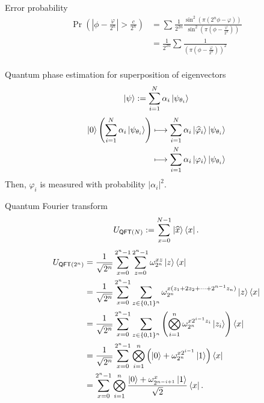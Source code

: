 \documentclass{beamer}
\newcommand\emm[1]{\textcolor{redorange}{{#1}}}
\begin{document}
\begin{frame}{Error probability}
\begin{align*}
\Pr\left(\left|\phi - \frac{\varphi}{2^n}\right| > \frac{c}{2^n}\right)
&=\sum_{} \frac1{2^{2n}}\frac{\sin^2\left(\pi\left(2^n\phi - \varphi\right)\right)}{\sin^2\left(\pi\left(\phi - \frac{\varphi}{2^n}\right)\right)}\\
&= \frac1{2^{2n}}\sum_{}\frac{1}{\left(\pi\left(\phi - \frac{\varphi}{2^n}\right)\right)^2}\\
\end{align*}
\end{frame}
\fi

\begin{frame}{Quantum phase estimation for superposition of eigenvectors}
\begin{align*}
\ket{\psi} := \sum_{i=1}^N \alpha_i \ket{\psi_{\theta_i}}
\end{align*}
\begin{align*}
\ket{0}\left(\sum_{i=1}^N \alpha_i \ket{\psi_{\theta_i}}\right)
&\longmapsto \sum_{i=1}^N \alpha_i \ket{\widehat{\varphi}_i}\ket{\psi_{\theta_i}}\\
&\longmapsto \sum_{i=1}^N \alpha_i \ket{\varphi_i}\ket{\psi_{\theta_i}}
\end{align*}
Then, \emm{$\varphi_i$} is measured with probability $|\alpha_i|^2$.
\end{frame}

\begin{frame}{Quantum Fourier transform}
\small
\vspace{-1em}
\begin{align*}
U_{\mathsf{QFT}(N)} := \sum_{x=0}^{N-1}\ket{\widehat{x}}\bra{x}.
\end{align*}
\begin{align*}
U_{\mathsf{QFT}(2^n)} &= \frac1{\sqrt{2^{n}}}\sum_{x=0}^{2^n-1}\sum_{z=0}^{2^n-1}\omega_{2^n}^{xz}\ket{z}\bra{x}\\
&= \frac1{\sqrt{2^{n}}}\sum_{x=0}^{2^n-1}\sum_{z\in\{0,1\}^n}\omega_{2^n}^{x(z_1+2z_2+\dotsb +2^{n-1}z_n)}\ket{z}\bra{x}\\
&= \frac1{\sqrt{2^{n}}}\sum_{x=0}^{2^n-1}\sum_{z\in\{0,1\}^n}\left(\bigotimes_{i=1}^n\omega_{2^n}^{x2^{i-1}z_i}\ket{z_i}\right)\bra{x}\\
&= \frac1{\sqrt{2^{n}}}\sum_{x=0}^{2^n-1}\bigotimes_{i=1}^n \left(\ket{0} + \omega_{2^n}^{x2^{i-1}}\ket{1}\right)\bra{x}\\
&= \sum_{x=0}^{2^n-1}\bigotimes_{i=1}^n \frac{\ket{0} + \omega_{2^{n-i+1}}^{x}\ket{1}}{\sqrt{2}}\bra{x}.
\end{align*}
\end{frame}
\end{document}
